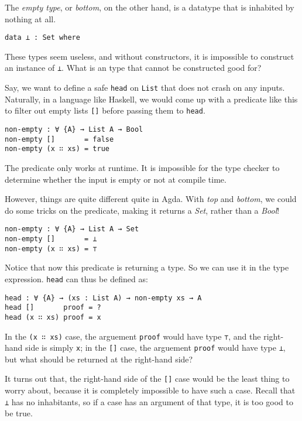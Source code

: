 \documentclass[../thesis.tex]{subfiles}
\begin{document}
The \textit{empty type}, or \textit{bottom}, on the other hand, is a datatype
that is inhabited by nothing at all.

\begin{lstlisting}
data ⊥ : Set where
\end{lstlisting}

These types seem useless, and without constructors, it is impossible to
construct an instance of {\lstinline|⊥|}. What is an type that cannot be
constructed good for?

Say, we want to define a safe {\lstinline|head|} on {\lstinline|List|} that
does not crash on any inputs. Naturally, in a language like Haskell,
we would come up with a predicate like this to filter out empty lists
{\lstinline|[]|} before passing them to {\lstinline|head|}.

\begin{lstlisting}
non-empty : ∀ {A} → List A → Bool
non-empty []       = false
non-empty (x ∷ xs) = true
\end{lstlisting}

The predicate only works at runtime. It is impossible for the type
checker to determine whether the input is empty or not at compile time.

However, things are quite different quite in Agda. With \textit{top} and \textit{bottom},
we could do some tricks on the predicate, making it returns a \textit{Set}, rather
than a \textit{Bool}!

\begin{lstlisting}
non-empty : ∀ {A} → List A → Set
non-empty []       = ⊥
non-empty (x ∷ xs) = ⊤
\end{lstlisting}

Notice that now this predicate is returning a type. So we can use it in the type
expression. {\lstinline|head|} can thus be defined as:

\begin{lstlisting}
head : ∀ {A} → (xs : List A) → non-empty xs → A
head []       proof = ?
head (x ∷ xs) proof = x
\end{lstlisting}

In the {\lstinline|(x ∷ xs)|} case, the arguement {\lstinline|proof|} would
have type {\lstinline|⊤|}, and the right-hand side is simply {\lstinline|x|};
in the {\lstinline|[]|} case, the arguement {\lstinline|proof|} would
have type {\lstinline|⊥|}, but what should be returned at the right-hand side?

It turns out that, the right-hand side of the {\lstinline|[]|} case would be the
least thing to worry about, because it is completely impossible to have such a case.
Recall that {\lstinline|⊥|} has no inhabitants, so if a case has an argument of
that type, it is too good to be true.
\end{document}
